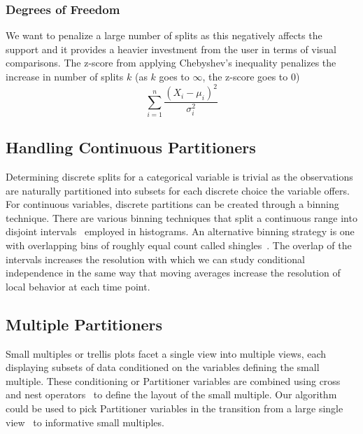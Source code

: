\subsubsection{Degrees of Freedom}
We want to penalize a large number of splits as this negatively affects the support and it provides a heavier investment from the user in terms of visual comparisons. The z-score from applying Chebyshev's inequality  penalizes the increase in number of splits $k$ (as $k$ goes to $\infty$, the z-score goes to $0$)
$$\sum_{i=1}^n \frac{(X_i-\mu_i)^2}{\sigma_i^2}$$

\subsection{Handling Continuous Partitioners}
Determining discrete splits for a categorical variable is trivial as the observations are naturally partitioned into subsets for each discrete choice the variable offers. For continuous variables, discrete partitions can be created through a binning technique. There are various binning techniques that split a continuous range into disjoint intervals~\cite{Freedman1981,Scott2009} employed in histograms. An alternative binning strategy is one with overlapping bins of roughly equal count called shingles~\cite{Becker1996 ?Cleveland book first??}. The overlap of the intervals increases the resolution with which we can study conditional independence in the same way that moving averages increase the resolution of local behavior at each time point.

\subsection{Multiple Partitioners}
Small multiples or trellis plots facet a single view into multiple views, each displaying subsets of data conditioned on the variables defining the small multiple. These conditioning or Partitioner variables are combined using cross and nest operators~\cite{Wilkinson2005GG,Stolte2002} to define the layout of the small multiple. Our algorithm could be used to pick Partitioner variables in the transition from a large single view~\cite{van2013} to informative small multiples.


